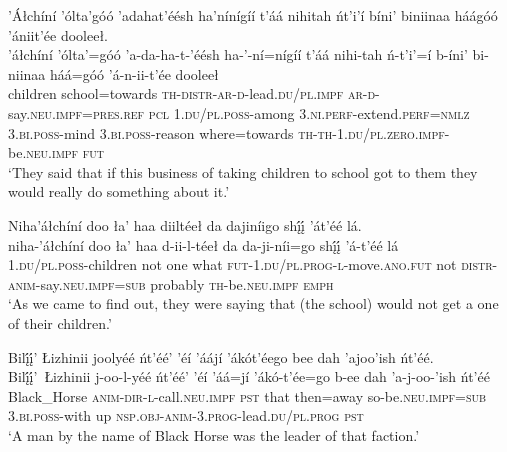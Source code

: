 \ea\label{ex:text1-21-4}
’Áłchíní ’ólta’góó ’adahat’éésh ha’nínígíí t’áá nihitah ńt’i’í bíni’ biniinaa háágóó ’ániit’ée dooleeł.\\
\gll ’áłchíní	’ólta’=góó	’a-da-ha-t-’éésh	ha-’-ní=nígíí	t’áá	nihi-tah	ń-t’i’=í	b-íni’	bi-niinaa	háá=góó	’á-n-ii-t’ée	dooleeł\\
     children	school=towards	\textsc{th}-\textsc{distr}-\textsc{ar}-\textsc{d}-lead.\textsc{du}/\textsc{pl}.\textsc{impf}	\textsc{ar}-\textsc{d}-say.\textsc{neu}.\textsc{impf}=\textsc{pres}.\textsc{ref}	\textsc{pcl}	1.\textsc{du}/\textsc{pl}.\textsc{poss}-among	3.\textsc{ni}.\textsc{perf}-extend.\textsc{perf}=\textsc{nmlz}	3.\textsc{bi}.\textsc{poss}-mind	3.\textsc{bi}.\textsc{poss}-reason	where=towards	\textsc{th}-\textsc{th}-1.\textsc{du}/\textsc{pl}.\textsc{zero}.\textsc{impf}-be.\textsc{neu}.\textsc{impf}	\textsc{fut}\\
\glt `They said that if this business of taking children to school got to them they would really do something about it.'
\z

\ea\label{ex:text1-21-5}
Niha’áłchíní doo ła’ haa diiltéeł da dajiníigo shį́į́ ’át’éé lá.\\
\gll niha-’áłchíní	doo	ła’	haa	d-ii-l-téeł	da	da-ji-níi=go	shį́į́	’á-t’éé	lá\\
     1.\textsc{du}/\textsc{pl}.\textsc{poss}-children	not	one	what	\textsc{fut}-1.\textsc{du}/\textsc{pl}.\textsc{prog}-\textsc{l}-move.\textsc{ano}.\textsc{fut}	not	\textsc{distr}-\textsc{anim}-say.\textsc{neu}.\textsc{impf}=\textsc{sub}	probably	\textsc{th}-be.\textsc{neu}.\textsc{impf}	\textsc{emph}\\
\glt `As we came to find out, they were saying that (the school) would not get a one of their children.'
\z

\ea\label{ex:text1-21-6}
Bilį́į́’ Łizhinii joolyéé ńt’éé’ ’éí ’áájí ’ákót’éego bee dah ’ajoo’ish ńt’éé.\\
\gll Bilį́į́’~{Łizhinii}	j-oo-l-yéé	ńt’éé’	’éí	’áá=jí	’ákó-t’ée=go	b-ee	dah	’a-j-oo-’ish	ńt’éé\\
     Black\_Horse	\textsc{anim}-\textsc{dir}-\textsc{l}-call.\textsc{neu}.\textsc{impf}	\textsc{pst}	that	then=away	so-be.\textsc{neu}.\textsc{impf}=\textsc{sub}	3.\textsc{bi}.\textsc{poss}-with	up	\textsc{nsp}.\textsc{obj}-\textsc{anim}-3.\textsc{prog}-lead.\textsc{du}/\textsc{pl}.\textsc{prog}	\textsc{pst}\\
\glt `A man by the name of Black Horse was the leader of that faction.'
\z

